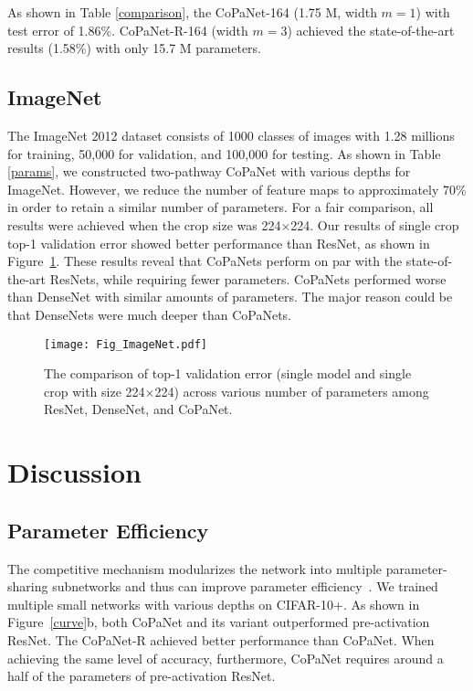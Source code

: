 \documentclass[wcp]{jmlr}
\begin{document}
As shown in Table \ref{comparison}, the CoPaNet-164 (1.75 M, width $m=1$) with test error of 1.86\%. 
CoPaNet-R-164 (width $m=3$) achieved the state-of-the-art results (1.58\%) with only 15.7 M parameters.

\subsection{ImageNet}
The ImageNet 2012 dataset consists of 1000 classes of images with 1.28 millions for training, 50,000 for validation, and 100,000 for testing. 
As shown in Table \ref{params}, we constructed two-pathway CoPaNet with various depths for ImageNet. 
However, we reduce the number of feature maps to approximately 70\% in order to retain a similar number of parameters. 
For a fair comparison, all results were achieved when the crop size was 224$\times$224. 
Our results of single crop top-1 validation error showed better performance than ResNet, as shown in Figure~\ref{imagenet}.
These results reveal that CoPaNets perform on par with the state-of-the-art ResNets, while requiring fewer parameters.
CoPaNets performed worse than DenseNet with similar amounts of parameters.
The major reason could be that DenseNets were much deeper than CoPaNets.


\begin{figure}
\centering
\texttt{[image: Fig\_ImageNet.pdf]}
\caption{The comparison of top-1 validation error (single model and single crop with size 224$\times$224)  across various number of parameters among ResNet, DenseNet, and CoPaNet. }
\label{imagenet}
\end{figure}







\section{Discussion}

\subsection{Parameter Efficiency}
The competitive mechanism modularizes the network into multiple parameter-sharing subnetworks and thus can improve parameter efficiency~\citep{srivastava2013compete}.
We trained multiple small networks with various depths on CIFAR-10+.
As shown in Figure~\ref{curve}b, both CoPaNet and its variant outperformed pre-activation ResNet.
The CoPaNet-R achieved better performance than CoPaNet.
When achieving the same level of accuracy, furthermore, CoPaNet requires around a half of the parameters of pre-activation ResNet.
\end{document}
